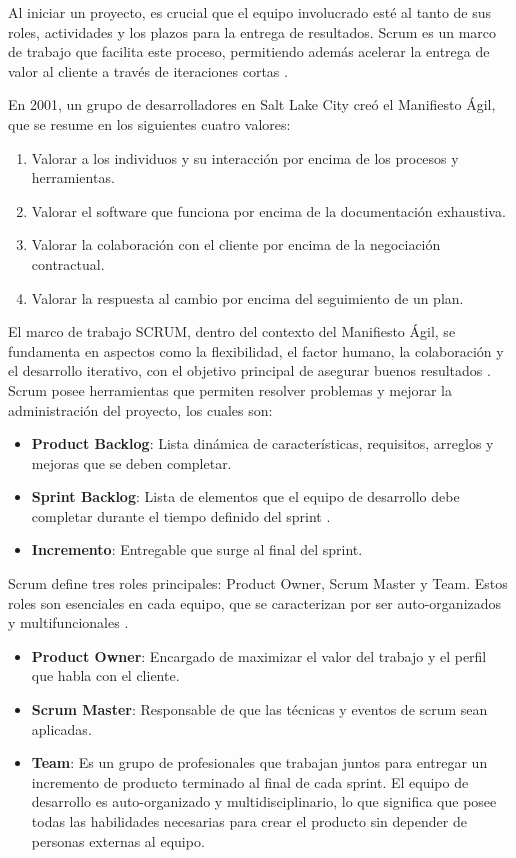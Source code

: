 Al iniciar un proyecto, es crucial que el equipo involucrado esté al tanto de sus roles, actividades y los plazos para la entrega de resultados. Scrum es un marco de trabajo que facilita este proceso, permitiendo además acelerar la entrega de valor al cliente a través de iteraciones cortas \cite{SCRUM}.

En 2001, un grupo de desarrolladores en Salt Lake City creó el Manifiesto Ágil, que se resume en los siguientes cuatro valores:

\begin{enumerate}
    \item Valorar a los individuos y su interacción por encima de los procesos y herramientas.
    \item Valorar el software que funciona por encima de la documentación exhaustiva.
    \item Valorar la colaboración con el cliente por encima de la negociación contractual.
    \item Valorar la respuesta al cambio por encima del seguimiento de un plan.
\end{enumerate}

El marco de trabajo SCRUM, dentro del contexto del Manifiesto Ágil, se fundamenta en aspectos como la flexibilidad, el factor humano, la colaboración y el desarrollo iterativo, con el objetivo principal de asegurar buenos resultados \cite{SCRUM}.
Scrum  posee herramientas que permiten resolver problemas y mejorar la administración del proyecto, los cuales son:
\begin{itemize}
    \item \textbf{Product Backlog}: Lista dinámica de características, requisitos, arreglos y mejoras que se deben completar.
    \item \textbf{Sprint Backlog}: Lista de elementos que el equipo de desarrollo debe completar durante el tiempo definido del sprint \cite{SCRUM-Sprints}.
    \item \textbf{Incremento}: Entregable que surge al final del sprint.
\end{itemize}


Scrum define tres roles principales: Product Owner, Scrum Master y Team. Estos roles son esenciales en cada equipo, que se caracterizan por ser auto-organizados y multifuncionales \cite{SCRUM-Roles}.

\begin{itemize}
    \item \textbf{Product Owner}: Encargado de maximizar el valor del trabajo y el perfil que habla con el cliente.
    \item \textbf{Scrum Master}: Responsable de que las técnicas y eventos de scrum sean aplicadas.
    \item \textbf{Team}:  Es un grupo de profesionales que trabajan juntos para entregar un incremento de producto terminado al final de cada sprint. El equipo de desarrollo es auto-organizado y multidisciplinario, lo que significa que posee todas las habilidades necesarias para crear el producto sin depender de personas externas al equipo.
\end{itemize}